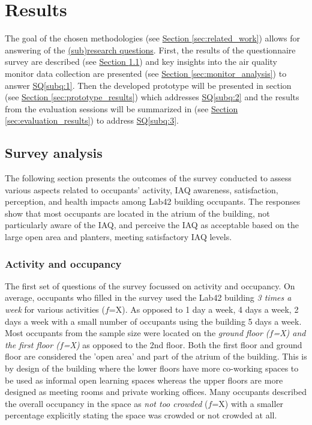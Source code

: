 \section{Results}
\label{sec:results}

The goal of the chosen methodologies (see \hyperref[sec:related_work]{Section \ref*{sec:related_work}}) allows for answering of the \hyperref[rq:1]{(sub)research questions}. First, the results of the questionnaire survey are described (see \hyperref[sec:survey_analysis]{Section \ref*{sec:survey_analysis}}) and key insights into the air quality monitor data collection are presented (see \hyperref[sec:monitor_analysis] {Section \ref*{sec:monitor_analysis}}) to answer \hyperref[subq:1]{SQ\ref*{subq:1}}. Then the developed prototype will be presented in section (see \hyperref[sec:prototype_results]{Section \ref*{sec:prototype_results}}) which addresses \hyperref[subq:2]{SQ\ref*{subq:2}} and the results from the evaluation sessions will be summarized in (see \hyperref[sec:evaluation_results]{Section \ref*{sec:evaluation_results}}) to address \hyperref[subq:3]{SQ\ref*{subq:3}}.

\subsection{Survey analysis}
\label{sec:survey_analysis}

The following section presents the outcomes of the survey conducted to assess various aspects related to occupants' activity, IAQ awareness, satisfaction, perception, and health impacts among Lab42 building occupants. The responses show that most occupants are located in the atrium of the building, not particularly aware of the IAQ, and perceive the IAQ as acceptable based on the large open area and planters, meeting satisfactory IAQ levels. 

\subsubsection{Activity and occupancy}

The first set of questions of the survey focussed on activity and occupancy. On average, occupants who filled in the survey used the Lab42 building \textit{3 times a week} for various activities ($f$=X). As opposed to 1 day a week, 4 days a week, 2 days a week with a small number of occupants using the building 5 days a week. Most occupants from the sample size were located on the \textit{ground floor ($f$=X) and the first floor ($f$=X)} as opposed to the 2nd floor. Both the first floor and ground floor are considered the 'open area' and part of the atrium of the building. This is by design of the building where the lower floors have more co-working spaces to be used as informal open learning spaces whereas the upper floors are more designed as meeting rooms and private working offices. Many occupants described the overall occupancy in the space as \textit{not too crowded} ($f$=X) with a smaller percentage explicitly stating the space was crowded or not crowded at all.

